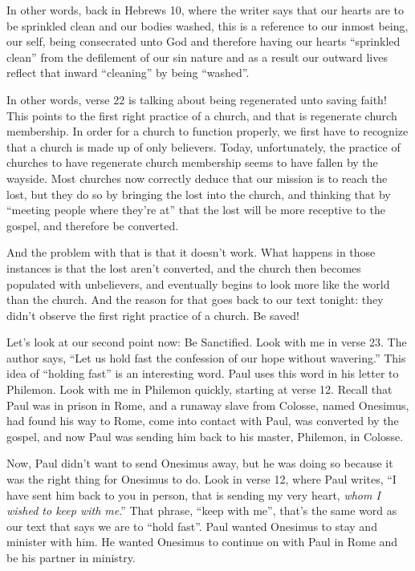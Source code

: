 \documentclass[letterpaper, 12pt]{article}
\begin{document}
    In other words, back in Hebrews 10, where the writer says that our
    hearts are to be sprinkled clean and our bodies washed, this is a
    reference to our inmost being, our self, being consecrated unto God
    and therefore having our hearts ``sprinkled clean'' from the
    defilement of our sin nature and as a result our outward lives
    reflect that inward ``cleaning'' by being ``washed''.

    In other words, verse 22 is talking about being regenerated unto
    saving faith! This points to the first right practice of a church,
    and that is regenerate church membership. In order for a church to
    function properly, we first have to recognize that a church is made
    up of only believers. Today, unfortunately, the practice of churches
    to have regenerate church membership seems to have fallen by the
    wayside. Most churches now correctly deduce that our mission is to
    reach the lost, but they do so by bringing the lost into the church,
    and thinking that by ``meeting people where they're at'' that the
    lost will be more receptive to the gospel, and therefore be
    converted.

    And the problem with that is that it doesn't work. What happens in
    those instances is that the lost aren't converted, and the church
    then becomes populated with unbelievers, and eventually begins to
    look more like the world than the church. And the reason for that
    goes back to our text tonight: they didn't observe the first
    right practice of a church. Be saved!

    Let's look at our second point now: Be Sanctified. Look with me in
    verse 23. The author says, ``Let us hold fast the confession of our
    hope without wavering.'' This idea of ``holding fast'' is an
    interesting word. Paul uses this word in his letter to Philemon.
    Look with me in Philemon quickly, starting at verse 12. Recall that
    Paul was in prison in Rome, and a runaway slave from Colosse, named
    Onesimus, had found his way to Rome, come into contact with Paul,
    was converted by the gospel, and now Paul was sending him back to
    his master, Philemon, in Colosse. 

    Now, Paul didn't want to send Onesimus away, but he was doing so
    because it was the right thing for Onesimus to do. Look in verse 12,
    where Paul writes, ``I have sent him back to you in person, that is
    sending my very heart, \emph{whom I wished to keep with me}.'' That
    phrase, ``keep with me'', that's the same word as our text that says
    we are to ``hold fast''. Paul wanted Onesimus to stay and minister
    with him. He wanted Onesimus to continue on with Paul in Rome and be
    his partner in ministry.
\end{document}
